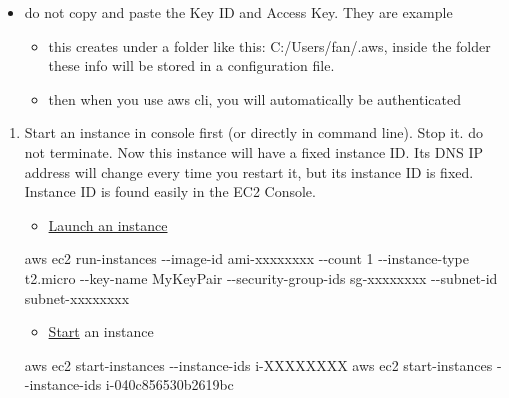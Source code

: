 \documentclass[
]{book}
\newenvironment{Shaded}{\begin{snugshade}}{\end{snugshade}}
\newcommand{\ExtensionTok}[1]{#1}
\newcommand{\NormalTok}[1]{#1}
\providecommand{\tightlist}{%
  \setlength{\itemsep}{0pt}\setlength{\parskip}{0pt}}
\begin{document}
\begin{itemize}
\tightlist
\item
  do not copy and paste the Key ID and Access Key. They are example

  \begin{itemize}
  \tightlist
  \item
    this creates under a folder like this: C:/Users/fan/.aws, inside the folder these info will be stored in a configuration file.
  \item
    then when you use aws cli, you will automatically be authenticated
  \end{itemize}
\end{itemize}

\begin{enumerate}
\def\labelenumi{\arabic{enumi}.}
\setcounter{enumi}{2}
\tightlist
\item
  Start an instance in console first (or directly in command line). Stop it. do not terminate. Now this instance will have a fixed instance ID. Its DNS IP address will change every time you restart it, but its instance ID is fixed. Instance ID is found easily in the EC2 Console.

  \begin{itemize}
  \tightlist
  \item
    \href{https://docs.aws.amazon.com/cli/latest/userguide/cli-ec2-launch.html}{Launch an instance}
  \end{itemize}

\begin{Shaded}
\begin{Highlighting}[]
\ExtensionTok{aws}\NormalTok{ ec2 run{-}instances {-}{-}image{-}id ami{-}xxxxxxxx {-}{-}count 1 {-}{-}instance{-}type t2.micro {-}{-}key{-}name MyKeyPair {-}{-}security{-}group{-}ids sg{-}xxxxxxxx {-}{-}subnet{-}id subnet{-}xxxxxxxx}
\end{Highlighting}
\end{Shaded}

  \begin{itemize}
  \tightlist
  \item
    \href{https://docs.aws.amazon.com/cli/latest/reference/ec2/start-instances.html}{Start} an instance
  \end{itemize}

\begin{Shaded}
\begin{Highlighting}[]
\ExtensionTok{aws}\NormalTok{ ec2 start{-}instances {-}{-}instance{-}ids i{-}XXXXXXXX}
\ExtensionTok{aws}\NormalTok{ ec2 start{-}instances {-}{-}instance{-}ids i{-}040c856530b2619bc}
\end{Highlighting}
\end{Shaded}


\end{enumerate}
\end{document}

